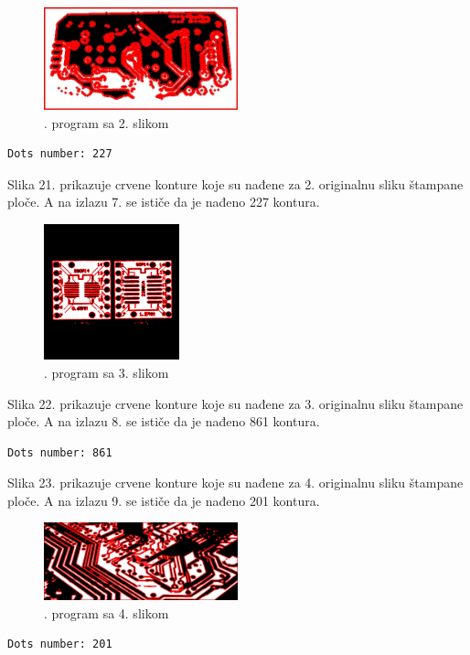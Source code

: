 \documentclass[fontsize=12bp, paper=a4]{scrarticle}
\begin{document}
\begin{figure}[h!]
    \centering
    \includegraphics[width=0.5\textwidth]{32.png}
    \caption{. program sa 2. slikom}
\end{figure} 

\begin{lstlisting}[caption=3. program sa 2. slikom]
Dots number: 227
\end{lstlisting}
Slika 21. prikazuje crvene konture koje su nađene za 2. originalnu sliku štampane ploče. A na izlazu 7. se ističe da je nađeno 227 kontura.
\begin{figure}[h!]
    \centering
    \includegraphics[width=0.35\textwidth]{33.png}
    \caption{. program sa 3. slikom}
\end{figure} 

Slika 22. prikazuje crvene konture koje su nađene za 3. originalnu sliku štampane ploče. A na izlazu 8. se ističe da je nađeno 861 kontura.
\begin{lstlisting}[caption=3. program sa 3. slikom]
Dots number: 861
\end{lstlisting}

Slika 23. prikazuje crvene konture koje su nađene za 4. originalnu sliku štampane ploče. A na izlazu 9. se ističe da je nađeno 201 kontura.

\begin{figure}[h!]
    \centering
    \includegraphics[width=0.5\textwidth]{34.png}
    \caption{. program sa 4. slikom}
\end{figure} 
\begin{lstlisting}[caption=3. program sa 4. slikom]
Dots number: 201
\end{lstlisting}
\newpage
\end{document}
